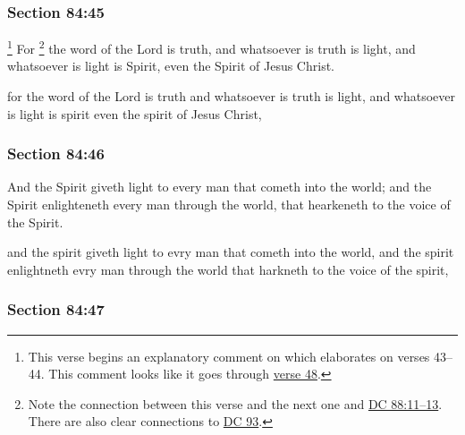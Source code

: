 	\subsubsection{Section 84:45} %
		\label{DC84-45}

			\footnote{%
				This verse begins an explanatory comment on which elaborates on verses 43--44. This comment looks like it goes through \hyperref[DC84-48]{verse 48}.
				}%
		For%
			\footnote{%
				Note the connection between this verse and the next one and \hyperref[DC88-11]{DC 88:11--13}. There are also clear connections to \hyperref[DC93]{DC 93}.
				}
		the word of the Lord is truth, and whatsoever is truth is light, and whatsoever is light is Spirit, even the Spirit of Jesus Christ.

		\begin{framed}
		\scriptsize
			\begin{compactdesc}
				\item[JSP] for the word of the Lord is truth and whatsoever is truth is light, and whatsoever is light is spirit even the spirit of Jesus Christ,
			\end{compactdesc}
		\end{framed}

	\subsubsection{Section 84:46} %
		\label{DC84-46}

		And the Spirit giveth light to every man that cometh into the world; and the Spirit enlighteneth every man through the world, that hearkeneth to the voice of the Spirit.

		\begin{framed}
		\scriptsize
			\begin{compactdesc}
				\item[JSP] and the spirit giveth light to evry man that cometh into the world, and the spirit enlightneth evry man through the world that harkneth to the voice of the spirit,
			\end{compactdesc}
		\end{framed}

	\subsubsection{Section 84:47} %
		\label{DC84-47}


